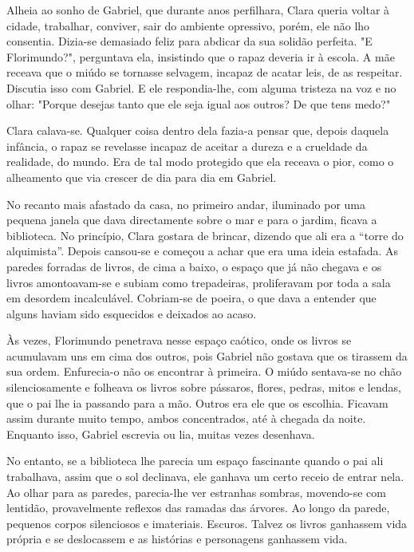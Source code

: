 Alheia ao sonho de Gabriel, que durante anos perfilhara, Clara queria
voltar à cidade, trabalhar, conviver, sair do ambiente opressivo, porém,
ele não lho consentia. Dizia-se demasiado feliz para abdicar da sua
solidão perfeita. "E Florimundo?", perguntava ela, insistindo que o
rapaz deveria ir à escola. A mãe receava que o miúdo se tornasse
selvagem, incapaz de acatar leis, de as respeitar. Discutia isso com
Gabriel. E ele respondia-lhe, com alguma tristeza na voz e no olhar:
"Porque desejas tanto que ele seja igual aos outros? De que tens medo?"

Clara calava-se. Qualquer coisa dentro dela fazia-a pensar que, depois
daquela infância, o rapaz se revelasse incapaz de aceitar a dureza e a
crueldade da realidade, do mundo. Era de tal modo protegido que ela
receava o pior, como o alheamento que via crescer de dia para dia em
Gabriel.

No recanto mais afastado da casa, no primeiro andar, iluminado por uma
pequena janela que dava directamente sobre o mar e para o jardim, ficava
a biblioteca. No princípio, Clara gostara de brincar, dizendo que ali
era a ``torre do alquimista''. Depois cansou-se e começou a achar que
era uma ideia estafada. As paredes forradas de livros, de cima a baixo,
o espaço que já não chegava e os livros amontoavam-se e subiam como
trepadeiras, proliferavam por toda a sala em desordem incalculável.
Cobriam-se de poeira, o que dava a entender que alguns haviam sido
esquecidos e deixados ao acaso.

Às vezes, Florimundo penetrava nesse espaço caótico, onde os livros se
acumulavam uns em cima dos outros, pois Gabriel não gostava que os
tirassem da sua ordem. Enfurecia-o não os encontrar à primeira. O miúdo
sentava-se no chão silenciosamente e folheava os livros sobre pássaros,
flores, pedras, mitos e lendas, que o pai lhe ia passando para a mão.
Outros era ele que os escolhia. Ficavam assim durante muito tempo, ambos
concentrados, até à chegada da noite. Enquanto isso, Gabriel escrevia ou
lia, muitas vezes desenhava.

No entanto, se a biblioteca lhe parecia um espaço fascinante quando o
pai ali trabalhava, assim que o sol declinava, ele ganhava um certo
receio de entrar nela. Ao olhar para as paredes, parecia-lhe ver
estranhas sombras, movendo-se com lentidão, provavelmente reflexos das
ramadas das árvores. Ao longo da parede, pequenos corpos silenciosos e
imateriais. Escuros. Talvez os livros ganhassem vida própria e se
deslocassem e as histórias e personagens ganhassem vida.

